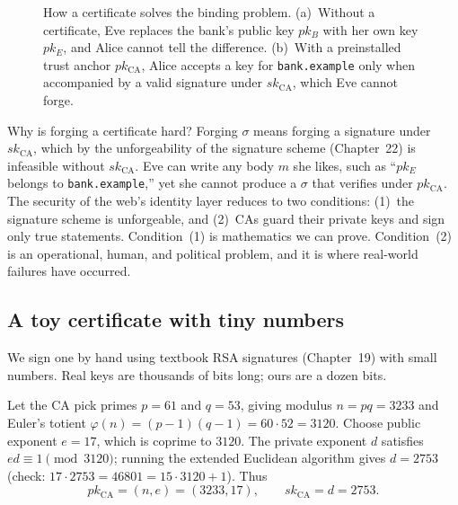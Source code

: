 \begin{figure}[htbp]
\caption{How a certificate solves the binding problem. (a)~Without a certificate, Eve replaces the bank's public key $pk_B$ with her own key $pk_E$, and Alice cannot tell the difference. (b)~With a preinstalled trust anchor $pk_{\mathrm{CA}}$, Alice accepts a key for \texttt{bank.example} only when accompanied by a valid signature under $sk_{\mathrm{CA}}$, which Eve cannot forge.}
\label{fig:ch24-binding}
\end{figure}

\begin{whybox}
Why is forging a certificate hard? Forging $\sigma$ means forging a signature under $sk_{\mathrm{CA}}$, which by the unforgeability of the signature scheme (Chapter~22) is infeasible without $sk_{\mathrm{CA}}$. Eve can write any body $m$ she likes, such as ``$pk_E$ belongs to \texttt{bank.example},'' yet she cannot produce a $\sigma$ that verifies under $pk_{\mathrm{CA}}$. The security of the web's identity layer reduces to two conditions: (1)~the signature scheme is unforgeable, and (2)~CAs guard their private keys and sign only true statements. Condition~(1) is mathematics we can prove. Condition~(2) is an operational, human, and political problem, and it is where real-world failures have occurred.
\end{whybox}

\subsection{A toy certificate with tiny numbers}

We sign one by hand using textbook RSA signatures (Chapter~19) with small numbers. Real keys are thousands of bits long; ours are a dozen bits.

Let the CA pick primes $p = 61$ and $q = 53$, giving modulus $n = pq = 3233$ and Euler's totient $\varphi(n) = (p-1)(q-1) = 60 \cdot 52 = 3120$. Choose public exponent $e = 17$, which is coprime to $3120$. The private exponent $d$ satisfies $ed \equiv 1 \pmod{3120}$; running the extended Euclidean algorithm gives $d = 2753$ (check: $17 \cdot 2753 = 46801 = 15 \cdot 3120 + 1$). Thus
\[
pk_{\mathrm{CA}} = (n, e) = (3233, 17), \qquad sk_{\mathrm{CA}} = d = 2753.
\]

